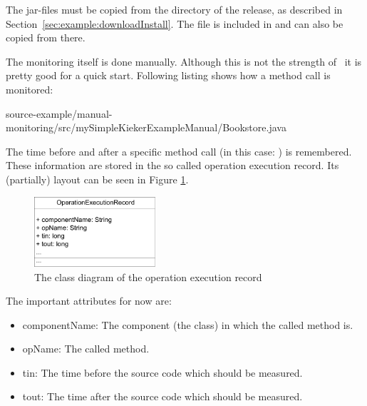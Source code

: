 The \Kieker{} jar-files must be copied from the  directory %
of the \Kieker{} release, as described in Section~\ref{sec:example:downloadInstall}. %
The file  is included in  %
and can also be copied from there.

The monitoring itself is done manually. Although this is not the strength of \Kieker\ it is pretty good for a quick start. Following listing shows how a method call is monitored:

\setJavaCodeListing
%
{source-example/manual-monitoring/src/mySimpleKiekerExampleManual/Bookstore.java}
 
The time before and after a specific method call (in this case: ) is remembered. These information are stored in the so called operation execution record. Its (partially) layout can be seen in Figure \ref{Figure:OperationExecutionRecordClassDiagram}.

\begin{figure}[H]
\begin{centering}
\includegraphics[width=0.4\textwidth]{images/OpExRecClassDiagram}
\caption{The class diagram of the operation execution record}
\label{Figure:OperationExecutionRecordClassDiagram}
\end{centering}
\end{figure}

The important attributes for now are:
\begin{itemize}
\item componentName: The component (the class) in which the called method is.
\item opName: The called method.
\item tin: The time before the source code which should be measured.
\item tout: The time after the source code which should be measured.
\end{itemize}

